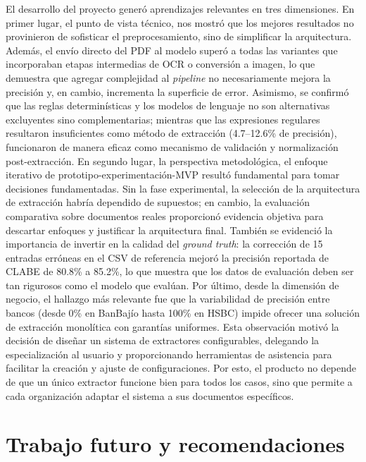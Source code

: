 El desarrollo del proyecto generó aprendizajes relevantes en tres dimensiones. En primer lugar, el punto de vista técnico, nos mostró que los mejores resultados no provinieron de sofisticar el preprocesamiento, sino de simplificar la arquitectura. Además, el envío directo del PDF al modelo superó a todas las variantes que incorporaban etapas intermedias de OCR o conversión a imagen, lo que demuestra que agregar complejidad al \textit{pipeline} no necesariamente mejora la precisión y, en cambio, incrementa la superficie de error. Asimismo, se confirmó que las reglas determinísticas y los modelos de lenguaje no son alternativas excluyentes sino complementarias; mientras que las expresiones regulares resultaron insuficientes como método de extracción (4.7--12.6\% de precisión), funcionaron de manera eficaz como mecanismo de validación y normalización post-extracción. En segundo lugar, la perspectiva metodológica, el enfoque iterativo de prototipo-experimentación-MVP resultó fundamental para tomar decisiones fundamentadas. Sin la fase experimental, la selección de la arquitectura de extracción habría dependido de supuestos; en cambio, la evaluación comparativa sobre documentos reales proporcionó evidencia objetiva para descartar enfoques y justificar la arquitectura final. También se evidenció la importancia de invertir en la calidad del \textit{ground truth}: la corrección de 15 entradas erróneas en el CSV de referencia mejoró la precisión reportada de CLABE de 80.8\% a 85.2\%, lo que muestra que los datos de evaluación deben ser tan rigurosos como el modelo que evalúan. Por último, desde la dimensión de negocio, el hallazgo más relevante fue que la variabilidad de precisión entre bancos (desde 0\% en BanBajío hasta 100\% en HSBC) impide ofrecer una solución de extracción monolítica con garantías uniformes. Esta observación motivó la decisión de diseñar un sistema de extractores configurables, delegando la especialización al usuario y proporcionando herramientas de asistencia para facilitar la creación y ajuste de configuraciones. Por esto, el producto no depende de que un único extractor funcione bien para todos los casos, sino que permite a cada organización adaptar el sistema a sus documentos específicos.

\section{Trabajo futuro y recomendaciones}


